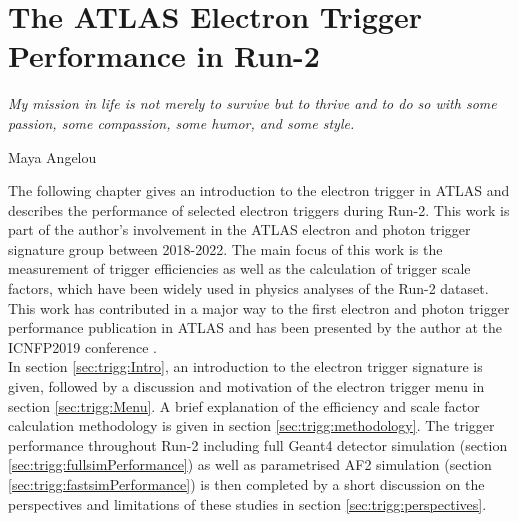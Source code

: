 \chapter{The ATLAS Electron Trigger Performance in Run-2}
\label{ch:trigger}
\epigraph{\emph{My mission in life is not merely to survive but to thrive and to do so with some passion, some compassion, some humor, and some style.}}{Maya Angelou}
The following chapter gives an introduction to the electron trigger in ATLAS and describes the performance of selected electron triggers during Run-2.  This work is part of the author's involvement in the ATLAS electron and photon trigger signature group between 2018-2022.  The main focus of this work is the measurement of trigger efficiencies as well as the calculation of trigger scale factors,  which have been widely used in physics analyses of the Run-2 dataset.
This work has contributed in a major way to the first electron and photon trigger performance publication in ATLAS \cite{TrigEgammaPaper} and has been presented by the author at the ICNFP2019 conference \cite{ICNFPtalk, ICNFPProceedings}.  \\
In section \ref{sec:trigg:Intro},  an introduction to the electron trigger signature is given,  followed by a discussion and motivation of the electron trigger menu in section \ref{sec:trigg:Menu}.  A brief explanation of the efficiency and scale factor calculation methodology is given in section \ref{sec:trigg:methodology}. The trigger performance throughout Run-2 including full Geant4 detector simulation (section \ref{sec:trigg:fullsimPerformance}) as well as parametrised AF2 simulation (section \ref{sec:trigg:fastsimPerformance}) is then completed by a short discussion on the perspectives and limitations of these studies in section \ref{sec:trigg:perspectives}. 
